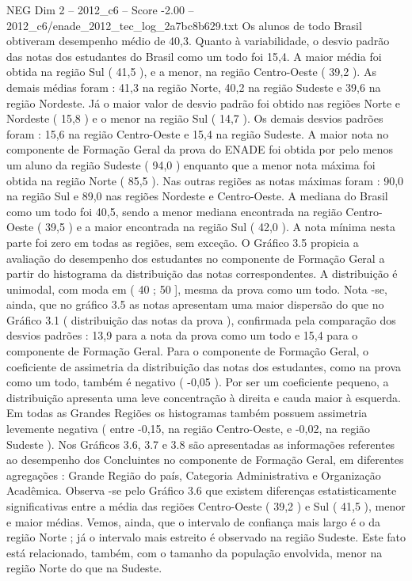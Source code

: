 \begin{textsample}{NEG Dim 2 – 2012\_c6 – Score -2.00 – 2012\_c6/enade\_2012\_tec\_log\_2a7bc8b629.txt}
Os alunos de todo Brasil obtiveram desempenho médio de 40,3.
Quanto à variabilidade, o desvio padrão das notas dos estudantes do Brasil como um todo foi 15,4.
A maior média foi obtida na região Sul ( 41,5 ), e a menor, na região Centro-Oeste ( 39,2 ).
As demais médias foram : 41,3 na região Norte, 40,2 na região Sudeste e 39,6 na região Nordeste.
Já o maior valor de desvio padrão foi obtido nas regiões Norte e Nordeste ( 15,8 ) e o menor na região Sul ( 14,7 ).
Os demais desvios padrões foram : 15,6 na região Centro-Oeste e 15,4 na região Sudeste.
A maior nota no componente de Formação Geral da prova do ENADE foi obtida por pelo menos um aluno da região Sudeste ( 94,0 ) enquanto que a menor nota máxima foi obtida na região Norte ( 85,5 ).
Nas outras regiões as notas máximas foram : 90,0 na região Sul e 89,0 nas regiões Nordeste e Centro-Oeste.
A mediana do Brasil como um todo foi 40,5, sendo a menor mediana encontrada na região Centro-Oeste ( 39,5 ) e a maior encontrada na região Sul ( 42,0 ).
A nota mínima nesta parte foi zero em todas as regiões, sem exceção.
O Gráfico 3.5 propicia a avaliação do desempenho dos estudantes no componente de Formação Geral a partir do histograma da distribuição das notas correspondentes.
A distribuição é unimodal, com moda em ( 40 ; 50 ], mesma da prova como um todo.
Nota -se, ainda, que no gráfico 3.5 as notas apresentam uma maior dispersão do que no Gráfico 3.1 ( distribuição das notas da prova ), confirmada pela comparação dos desvios padrões : 13,9 para a nota da prova como um todo e 15,4 para o componente de Formação Geral.
Para o componente de Formação Geral, o coeficiente de assimetria da distribuição das notas dos estudantes, como na prova como um todo, também é negativo ( -0,05 ).
Por ser um coeficiente pequeno, a distribuição apresenta uma leve concentração à direita e cauda maior à esquerda.
Em todas as Grandes Regiões os histogramas também possuem assimetria levemente negativa ( entre -0,15, na região Centro-Oeste, e -0,02, na região Sudeste ).
Nos Gráficos 3.6, 3.7 e 3.8 são apresentadas as informações referentes ao desempenho dos Concluintes no componente de Formação Geral, em diferentes agregações : Grande Região do país, Categoria Administrativa e Organização Acadêmica.
Observa -se pelo Gráfico 3.6 que existem diferenças estatisticamente significativas entre a média das regiões Centro-Oeste ( 39,2 ) e Sul ( 41,5 ), menor e maior médias.
Vemos, ainda, que o intervalo de confiança mais largo é o da região Norte ; já o intervalo mais estreito é observado na região Sudeste.
Este fato está relacionado, também, com o tamanho da população envolvida, menor na região Norte do que na Sudeste.

\end{textsample}
